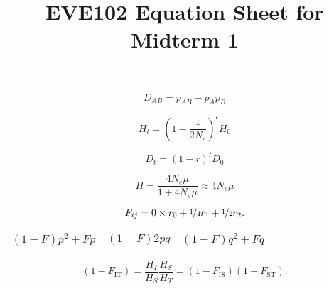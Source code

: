 \documentclass[12pt]{article}
\newcommand{\fis}{F_{\mathrm{IS}}}
\newcommand{\fit}{F_{\mathrm{IT}}}
\newcommand{\fst}{F_{\mathrm{ST}}}
\begin{document}
\title{EVE102 Equation Sheet for Midterm 1}
\date{}
\maketitle

\begin{equation}
D_{AB} = p_{AB} - p_Ap_B \nonumber
\end{equation}

\begin{equation}
H_t = \left(1-\frac{1}{2N_e} \right)^tH_0  \nonumber
\end{equation}

\begin{equation}
D_t=  (1-r)^t D_0 \nonumber
\end{equation}

\begin{equation}
  H = \frac{4N_e\mu}{1+4N_e\mu} \approx 4N_e\mu  \nonumber
\end{equation}

\begin{equation}
F_{ij}= 0 \times r_0 + \nicefrac{1}{4} r_1  + \nicefrac{1}{2} r_2.  \nonumber
\label{eqn:coeffkinship}
\end{equation}
\begin{center}
\begin{tabular}{ccc}
$(1-F) p^2 + F p$ & $(1-F) 2pq$ & $(1-F) q^2 + F q$ \nonumber
\end{tabular}
\end{center}

\begin{equation}
(1-\fit) =\frac{H_I}{H_S} \frac{H_S}{H_T}=(1-\fis)(1-\fst).\nonumber
\label{eqn:F_relationships}
\end{equation}
\end{document}
